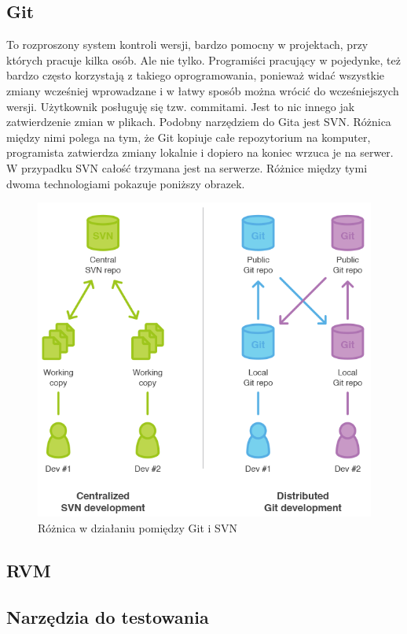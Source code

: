   \subsection{Git}
  To rozproszony system kontroli wersji, bardzo pomocny w projektach, przy których pracuje kilka osób. Ale nie tylko. Programiści pracujący w pojedynke, też bardzo często korzystają z takiego oprogramowania, ponieważ widać wszystkie zmiany wcześniej wprowadzane i w łatwy sposób można wrócić do wcześniejszych wersji. Użytkownik posługuję się tzw. commitami. Jest to nic innego jak zatwierdzenie zmian w plikach. Podobny narzędziem do Gita jest SVN. Różnica między nimi polega na tym, że Git kopiuje całe repozytorium na komputer, programista zatwierdza zmiany lokalnie i dopiero na koniec wrzuca je na serwer. W przypadku SVN całość trzymana jest na serwerze. Różnice między tymi dwoma technologiami pokazuje poniższy obrazek.

  \begin{figure}[h]
    \centering
    \includegraphics[scale=0.47]{images/gitsvn.png}
    \caption{Różnica w działaniu pomiędzy Git i SVN}
  \end{figure}

  \subsection{RVM}
  \subsection{Narzędzia do testowania}
